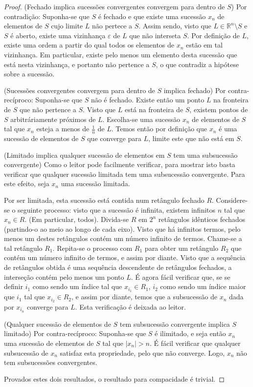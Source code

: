 \documentclass{article}
\newcommand{\R}{\mathbb{R}}
\theoremstyle{definition}
\begin{document}
	\begin{proof}
	(Fechado implica sucessões convergentes convergem para dentro de $S$) Por contradição: Suponha-se que $S$ é fechado e que existe uma sucessão $x_n$ de elementos de $S$ cujo limite $L$ não pertece a $S$. Assim sendo, visto que $L \in \R^n \setminus S$ e $S$ é aberto, existe uma vizinhança $\varepsilon$ de $L$ que não interseta $S$. Por definição de $L$, existe uma ordem a partir do qual todos os elementos de $x_n$ estão em tal vizinhança. Em particular, existe pelo menos um elemento desta sucessão que está nesta vizinhança, e portanto não pertence a $S$, o que contradiz a hipótese sobre a sucessão.
	
	(Sucessões convergentes convergem para dentro de $S$ implica fechado) Por contra-recíproco: Suponha-se que $S$ não é fechado. Existe então um ponto $L$ na fronteira de $S$ que não pertence a $S$. Visto que $L$ está na fronteira de $S$, existem pontos de $S$ arbitráriamente próximos de $L$. Escolha-se uma sucessão $x_n$ de elementos de $S$ tal que $x_n$ esteja a menos de $\frac 1 n$ de $L$. Temos então por definição que $x_n$ é uma sucessão de elementos de $S$ que converge para $L$, limite este que não está em $S$.
	
	(Limitado implica qualquer sucessão de elementos em $S$ tem uma subsucessão convergente) Como o leitor pode facilmente verificar, para mostrar isto basta verificar que qualquer sucessão limitada tem uma subsucessão convergente. Para este efeito, seja $x_n$ uma sucessão limitada.
	
	Por ser limitada, esta sucessão está contida num retângulo fechado $R$. Considere-se o seguinte processo: visto que a sucessão é infinita, existem infinitos $n$ tal que $x_n \in R$. (Em particular, todos). Divida-se $R$ em $2^n$ retângulos idênticos fechados (partindo-o ao meio ao longo de cada eixo). Visto que há infinitos termos, pelo menos um destes retângulos contém um número infinito de termos. Chame-se a tal retângulo $R_1$. Repita-se o processo com $R_1$ para obter um retângulo $R_2$ que contém um número infinito de termos, e assim por diante. Visto que a sequência de retângulos obtida é uma sequência descendente de retângulos fechados, a interseção contém pelo menos um ponto $L$. É agora fácil verificar que, se se definir $i_1$ como sendo um índice tal que $x_{i_1} \in R_1$, $i_2$ como sendo um índice maior que $i_1$ tal que $x_{i_2} \in R_2$, e assim por diante, temos que a subsucessão de $x_n$ dada por $x_{i_n}$ converge para $L$. Esta verificação é deixada ao leitor.
	
	(Qualquer sucessão de elementos de $S$ tem subsucessão convergente implica $S$ limitado) Por contra-recíproco: Suponha-se que $S$ é ilimitado, e seja então $x_n$ uma sucessão de elementos de $S$ tal que $\lvert x_n \rvert > n$. É fácil verificar que qualquer subsucessão de $x_n$ satisfaz esta propriedade, pelo que não converge. Logo, $x_n$ não tem subsucessões convergentes.
	
	Provados estes dois resultados, o resultado para compacidade é trivial.
	\end{proof}
	
\end{document}
